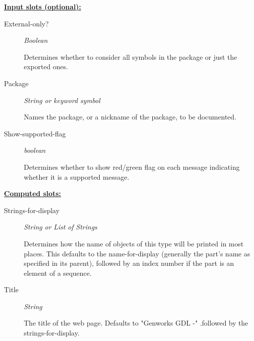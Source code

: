 \documentclass [11pt]{book}
\begin{document}
\begin{itemize}
\textbf{
\underline{Input slots (optional):}}

\begin{description}

\item [External-only?]
\emph{Boolean}

 Determines whether to consider all symbols in the package or just the exported ones.




\item [Package]
\emph{String or keyword symbol}

 Names the package, or a nickname of the package, to be documented.




\item [Show-supported-flag]
\emph{boolean}

 Determines whether to show red/green flag on each message indicating whether it is a
supported message.




\end{description}






\textbf{
\underline{Computed slots:}}

\begin{description}

\item [Strings-for-display]
\emph{String or List of Strings}

 Determines how the name of objects of
this type will be printed in most places.  This defaults to the
name-for-display (generally the part's name as specified in its
parent), followed by an index number if the part is an element of a
sequence.




\item [Title]
\emph{String}

 The title of the web page. Defaults to "Genworks GDL -"
.followed by the strings-for-display.




\end{description}







\end{itemize}
\end{document}
